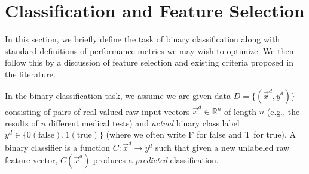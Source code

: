 \section{Classification and Feature Selection}

In this section, we briefly define the task of binary classification
along with standard definitions of performance metrics we may wish 
to optimize.  We then follow this by a discussion of feature selection and
existing criteria proposed in the literature.

In the binary classification task, we assume we are given data $D = \{
(\vec{x}^d, y^d) \}$ consisting of pairs of real-valued raw 
input vectors $\vec{x}^d \in \mathbb{R}^n$
of length $n$ (e.g., the results of $n$ different medical tests) and
\emph{actual} binary class label $y^d \in \{ 0 (\mathrm{false}), 1 (\mathrm{true}) \}$ (where
we often write F for false and T for true).
A binary classifier is a function $C: \vec{x}^d \to y^d$ such that given
a new unlabeled raw feature vector, $C(\vec{x}^d)$ produces a \emph{predicted}
classification.

